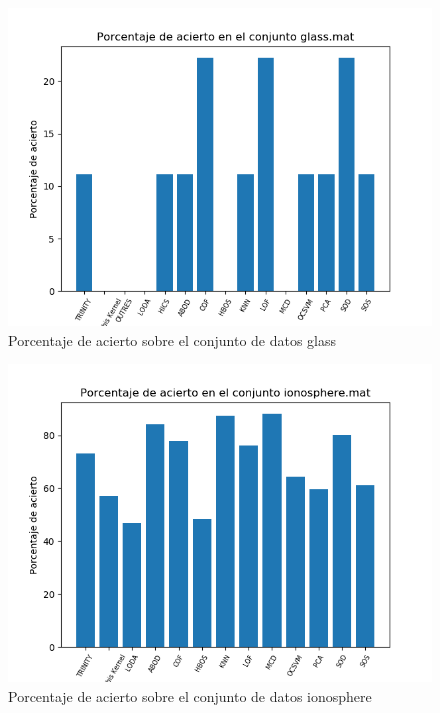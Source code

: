 \begin{figure}[H]
	\centering
	\includegraphics[scale=0.7]{imagenes/imgs-exp1/accuracy/glass}
	\caption{Porcentaje de acierto sobre el conjunto de datos glass}
	\label{glass_accuracy}
\end{figure}

\begin{figure}[H]
	\centering
	\includegraphics[scale=0.7]{imagenes/imgs-exp1/accuracy/ionosphere}
	\caption{Porcentaje de acierto sobre el conjunto de datos ionosphere}
	\label{ionosphere_accuracy}
\end{figure}

